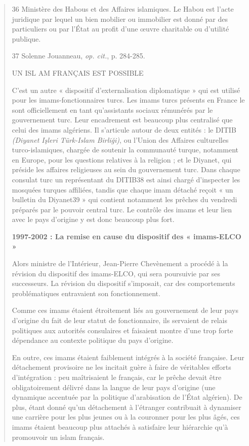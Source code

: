 \begin{quote}
36 Ministère des Habous et des Affaires islamiques. Le Habou est l'acte
juridique par lequel un bien mobilier ou immobilier est donné par des
particuliers ou par l'État au profit d'une œuvre charitable ou d'utilité
publique.

37 Solenne Jouanneau, \emph{op. cit.}, p. 284-285.

UN ISL AM FRANÇAIS EST POSSIBLE

C'est un autre « dispositif d'externalisation diplomatique » qui est
utilisé pour les imams-fonctionnaires turcs. Les imams turcs présents en
France le sont officiellement en tant qu'assistants sociaux rémunérés
par le gouvernement turc. Leur encadrement est beaucoup plus centralisé
que celui des imams algériens. Il s'articule autour de deux entités : le
DITIB \emph{(Diyanet Işleri Türk-Islam Birliği)}, ou l'Union des
Affaires culturelles turco-islamiques, chargée de soutenir la communauté
turque, notamment en Europe, pour les questions relatives à la religion
; et le Diyanet, qui préside les affaires religieuses au sein du
gouvernement turc. Dans chaque consulat turc un représentant du DITIB38
est ainsi chargé d'inspecter les mosquées turques affiliées, tandis que
chaque imam détaché reçoit « un bulletin du Diyanet39 » qui contient
notamment les prêches du vendredi préparés par le pouvoir central turc.
Le contrôle des imams et leur lien avec le pays d'origine y est donc
beaucoup plus fort.

\textbf{1997-2002 : La remise en cause du dispositif des « imams-ELCO »}

Alors ministre de l'Intérieur, Jean-Pierre Chevènement a procédé à la
révision du dispositif des imams-ELCO, qui sera poursuivie par ses
successeurs. La révision du dispositif s'imposait, car des comportements
problématiques entravaient son fonctionnement.

Comme ces imams étaient étroitement liés au gouvernement de leur pays
d'origine du fait de leur statut de fonctionnaire, ils servaient de
relais politiques aux autorités consulaires et faisaient montre d'une
trop forte dépendance au contexte politique du pays d'origine.

En outre, ces imams étaient faiblement intégrés à la société française.
Leur détachement provisoire ne les incitait guère à faire de véritables
efforts d'intégration : peu maîtrisaient le français, car le prêche
devait être obligatoirement délivré dans la langue de leur pays
d'origine (une dynamique accentuée par la politique d'arabisation de
l'État algérien). De plus, étant donné qu'un détachement à l'étranger
contribuait à dynamiser une carrière pour les plus jeunes ou à la
couronner pour les plus âgés, ces imams étaient beaucoup plus attachés à
satisfaire leur hiérarchie qu'à promouvoir un islam français.


\end{quote}
